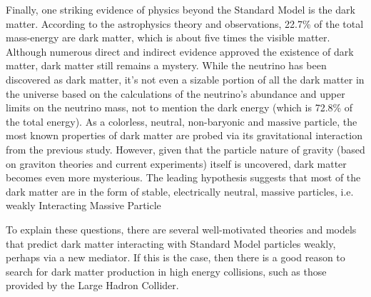 \par Finally, one striking evidence of physics beyond the Standard Model is the dark matter. According to the astrophysics theory and observations, 22.7\% of the total mass-energy are dark matter, which is about five times the visible matter. Although numerous direct and indirect evidence approved the existence of dark matter, dark matter still remains a mystery. While the neutrino has been discovered as dark matter, it's not even a sizable portion of all the dark matter in the universe based on the calculations of the neutrino's abundance and upper limits on the neutrino mass, not to mention the dark energy (which is 72.8\% of the total energy). As a colorless, neutral, non-baryonic and massive particle, the most known properties of dark matter are probed via its gravitational interaction from the previous study. However, given that the particle nature of gravity (based on graviton theories and current experiments) itself is uncovered, dark matter becomes even more mysterious. The leading hypothesis suggests that most of the dark matter are in the form of stable, electrically neutral, massive particles, i.e. weakly Interacting Massive Particle

\par To explain these questions, there are several well-motivated theories and models that predict dark matter interacting with Standard Model particles weakly, perhaps via a new mediator. If this is the case, then there is a good reason to search for dark matter production in high energy collisions, such as those provided by the Large Hadron Collider.
